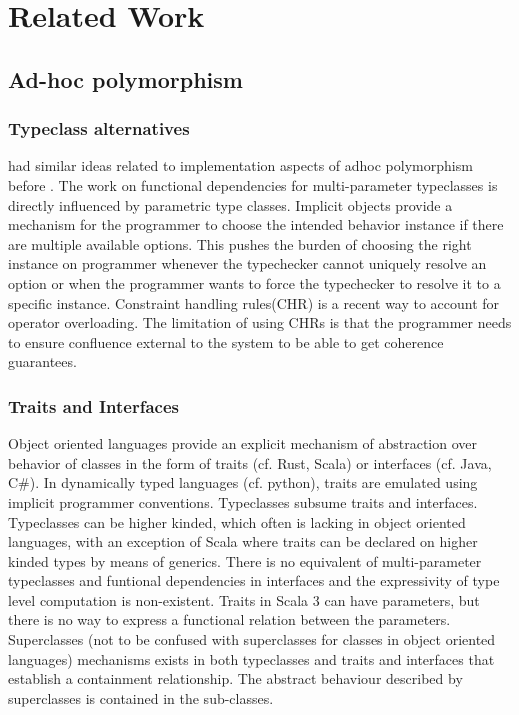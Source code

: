 \documentclass[screen,nonacm,manuscript,review]{acmart} %
\begin{document}
\section{Related Work}\label{sec:related-work}
\subsection{Ad-hoc polymorphism}\label{sec:rw-adhoc-poly}
\subsubsection{Typeclass alternatives}
\citet{kaes_parametric_1988} had similar ideas related to
implementation aspects of adhoc polymorphism before
\citet{wadler_polymorphism_1989}. The work on functional dependencies
for multi-parameter typeclasses is directly influenced by parametric
type classes\cite{chen_parametric_1992}. Implicit
objects\cite{oliveira_typeclasses_2010} provide a mechanism for the
programmer to choose the intended behavior instance if
there are multiple available options. This pushes the burden of choosing the
right instance on programmer whenever the typechecker cannot uniquely
resolve an option or when the programmer wants to force the
typechecker to resolve it to a specific instance. Constraint handling
rules(CHR)\cite{fruhwirth_theory_1998,stuckey_theory_2005} is a recent
way to account for operator overloading. The limitation of using CHRs
is that the programmer needs to ensure confluence external to the
system to be able to get coherence guarantees.

\subsubsection{Traits and Interfaces}
Object oriented languages provide an explicit mechanism of abstraction
over behavior of classes in the form of traits (cf. Rust, Scala) or
interfaces (cf. Java, C\#). In dynamically typed languages
(cf. python), traits are emulated using implicit programmer
conventions. Typeclasses subsume traits and interfaces. Typeclasses
can be higher kinded, which often is lacking in object oriented
languages, with an exception of Scala where traits can be declared on
higher kinded types by means of generics. There is no equivalent of
multi-parameter typeclasses and funtional dependencies in interfaces
and the expressivity of type level computation is non-existent. Traits
in Scala 3 can have parameters, but there is no way to express a
functional relation between the parameters. Superclasses (not to be
confused with superclasses for classes in object oriented languages)
mechanisms exists in both typeclasses and traits and interfaces that
establish a containment relationship. The abstract behaviour described
by superclasses is contained in the sub-classes.
\end{document}
